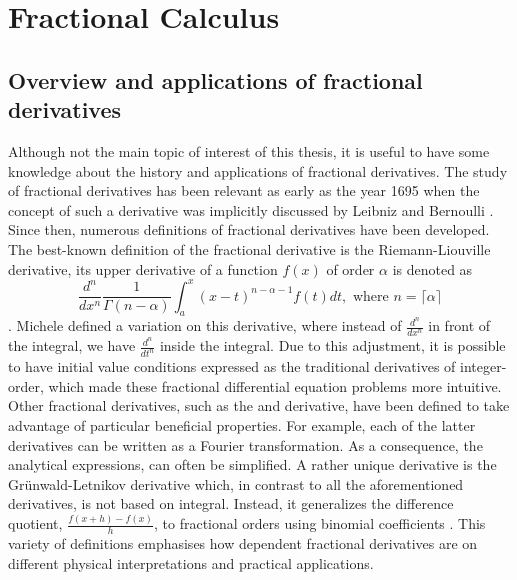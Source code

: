 \section{Fractional Calculus}\label{s:calculus}
\subsection{Overview and applications of fractional derivatives}\label{ss:calculus_introduction}
Although not the main topic of interest of this thesis, it is useful to have some knowledge about the history and applications of fractional derivatives. The study of fractional derivatives has been relevant as early as the year 1695 when the concept of such a derivative was implicitly discussed by Leibniz and Bernoulli \cite{katugampola2014}. Since then, numerous definitions of fractional derivatives have been developed. The best-known definition of the fractional derivative is the Riemann-Liouville derivative, its upper derivative of a function \(f(x)\) of order \(\alpha\) is denoted as 
\[\frac{d^n}{dx^n}\frac{1}{\Gamma(n -\alpha)} \int_{a}^{x} (x-t)^{n - \alpha -1} f(t) dt, \text{ where }n = \lceil\alpha \rceil \] \cite{kilbas2006}.
Michele \cite{caputo1967} defined a variation on this derivative, where instead of \(\frac{d^n}{dx^n}\) in front of the integral, we have \(\frac{d^n}{dt^n}\) inside the integral. Due to this adjustment, it is possible to have initial value conditions expressed as the traditional derivatives of integer-order, which made these fractional differential equation problems more intuitive. Other fractional derivatives, such as the \cite{hadamard1892} and \cite{riesz1949} derivative, have been defined to take advantage of particular beneficial properties. For example, each of the latter derivatives can be written as a Fourier transformation. As a consequence, the analytical expressions, can often be simplified. A rather unique derivative is the Grünwald-Letnikov derivative which, in contrast to all the aforementioned derivatives, is not based on integral. Instead, it generalizes the difference quotient, \(\frac{f(x+h) - f(x)}{h}\),  to fractional orders using binomial coefficients \cite{atici2021}. This variety of definitions emphasises how dependent fractional derivatives are  on different physical interpretations and practical applications.
